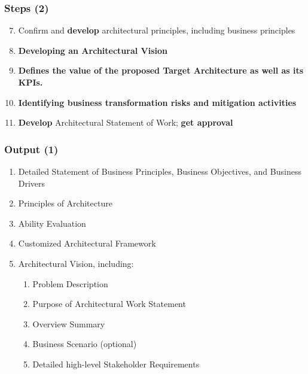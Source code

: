 \documentclass[aspectratio=169, table]{beamer}
\begin{document}
    \begin{frame}
        \frametitle{Steps (2)}
        \begin{enumerate}
            \setcounter{enumi}{6}
            \item Confirm and \textbf{develop} architectural principles, including business principles
            \item \textbf{Developing an Architectural Vision}
            \item \textbf{Defines the value of the proposed Target Architecture as well as its KPIs.}
            \item \textbf{Identifying business transformation risks and mitigation activities}
            \item \textbf{Develop} Architectural Statement of Work; \textbf{get approval}


        \end{enumerate}
    \end{frame}


    \begin{frame}
        \frametitle{Output (1)}
        \vspace{1cm}
        \begin{enumerate}
            \item Detailed Statement of Business Principles, Business Objectives, and Business Drivers
            \item Principles of Architecture
            \item Ability Evaluation
            \item Customized Architectural Framework
            \item Architectural Vision, including:
            \begin{enumerate}
                \item Problem Description
                \item Purpose of Architectural Work Statement
                \item Overview Summary
                \item Business Scenario (optional)
                \item Detailed high-level Stakeholder Requirements
            \end{enumerate}
        \end{enumerate}
    \end{frame}
\end{document}
